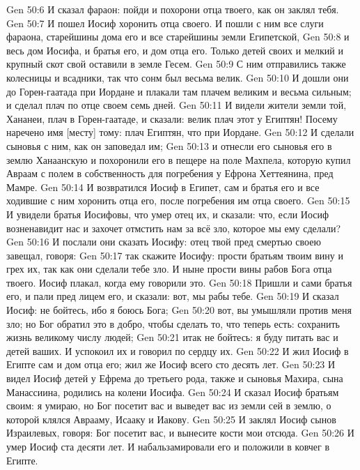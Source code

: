 \vs Gen 50:6 И сказал фараон: пойди и похорони отца твоего, как он заклял тебя.
\vs Gen 50:7 И пошел Иосиф хоронить отца своего. И пошли с ним все слуги фараона, старейшины дома его и все старейшины земли Египетской,
\vs Gen 50:8 и весь дом Иосифа, и братья его, и дом отца его. Только детей своих и мелкий и крупный скот свой оставили в земле Гесем.
\vs Gen 50:9 С ним отправились также колесницы и всадники, так что сонм был весьма велик.
\vs Gen 50:10 И дошли они до Горен-гаатада при Иордане и плакали там плачем великим и весьма сильным; и сделал  плач по отце своем семь дней.
\vs Gen 50:11 И видели жители земли той, Хананеи, плач в Горен-гаатаде, и сказали: велик плач этот у Египтян! Посему наречено имя [месту] тому: плач Египтян, что при Иордане.
\vs Gen 50:12 И сделали сыновья  с ним, как он заповедал им;
\vs Gen 50:13 и отнесли его сыновья его в землю Ханаанскую и похоронили его в пещере на поле Махпела, которую купил Авраам с полем в собственность для погребения у Ефрона Хеттеянина, пред Мамре.
\rsbpar\vs Gen 50:14 И возвратился Иосиф в Египет, сам и братья его и все ходившие с ним хоронить отца его, после погребения им отца своего.
\vs Gen 50:15 И увидели братья Иосифовы, что умер отец их, и сказали: что, если Иосиф возненавидит нас и захочет отмстить нам за всё зло, которое мы ему сделали?
\vs Gen 50:16 И послали они сказать Иосифу: отец твой пред смертью своею завещал, говоря:
\vs Gen 50:17 так скажите Иосифу: прости братьям твоим вину и грех их, так как они сделали тебе зло. И ныне прости вины рабов Бога отца твоего. Иосиф плакал, когда ему говорили это.
\vs Gen 50:18 Пришли и сами братья его, и пали пред лицем его, и сказали: вот, мы рабы тебе.
\vs Gen 50:19 И сказал Иосиф: не бойтесь, ибо я боюсь Бога;
\vs Gen 50:20 вот, вы умышляли против меня зло; но Бог обратил это в добро, чтобы сделать то, что теперь есть: сохранить жизнь великому числу людей;
\vs Gen 50:21 итак не бойтесь: я буду питать вас и детей ваших. И успокоил их и говорил по сердцу их.
\rsbpar\vs Gen 50:22 И жил Иосиф в Египте сам и дом отца его; жил же Иосиф всего сто десять лет.
\vs Gen 50:23 И видел Иосиф детей у Ефрема до третьего рода, также и сыновья Махира, сына Манассиина, родились на колени Иосифа.
\vs Gen 50:24 И сказал Иосиф братьям своим: я умираю, но Бог посетит вас и выведет вас из земли сей в землю, о которой клялся Аврааму, Исааку и Иакову.
\vs Gen 50:25 И заклял Иосиф сынов Израилевых, говоря: Бог посетит вас, и вынесите кости мои отсюда.
\vs Gen 50:26 И умер Иосиф ста десяти лет. И набальзамировали его и положили в ковчег в Египте.

